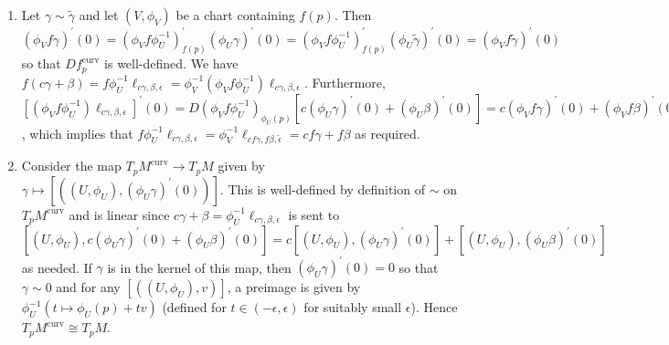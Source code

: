 \documentclass[11pt,leqno]{article}
\theoremstyle{plain}
\theoremstyle{definition}
\numberwithin{equation}{section}
\numberwithin{lem}{section}
\begin{document}
\begin{enumerate}
\begin{enumerate}
      The scalar multiplication on $T_pM^{\mathrm{curv}}$ is given by $c\gamma = \gamma(c(\cdot))\colon (-\epsilon/\abs{c},\epsilon/\abs{c})\to M$. This operation is well-defined since if $\gamma\sim\tilde \gamma$, then $(\phi_Uc\gamma)^\prime(0) = c(\phi_U\gamma)^\prime(0) = c(\phi_U\tilde\gamma)^\prime(0) = (\phi_Uc\tilde\gamma)^\prime(0)$ as needed. Observe that $(a+b)\gamma = a\gamma + b\gamma$ since $\ell_{a\gamma,b\gamma,\epsilon}^\prime = (a+b)(\phi_U\gamma)^\prime(0)$. It follows from the definition that the scalar multiplication satisfies the remaining unital and associative properties required to make $T_pM^{\mathrm{curv}}$ a vector space.
      \item Let $\gamma\sim\tilde\gamma$ and let $(V,\phi_V)$ be a chart containing $f(p)$. Then $(\phi_Vf\gamma)^\prime(0) = (\phi_Vf\phi_U^{-1})^\prime_{f(p)}(\phi_U\gamma)^\prime(0) = (\phi_Vf\phi_U^{-1})^\prime_{f(p)}(\phi_U\tilde\gamma)^\prime(0) = (\phi_Vf\tilde\gamma)^\prime(0)$ so that $Df_p^{\mathrm{curv}}$ is well-defined. We have $f(c\gamma + \beta) = f\phi_U^{-1}\ell_{c\gamma,\beta,\epsilon} = \phi_V^{-1}(\phi_Vf\phi_U^{-1})\ell_{c\gamma,\beta,\epsilon}$. Furthermore, $[(\phi_Vf\phi_U^{-1})\ell_{c\gamma,\beta,\epsilon}]^\prime(0) = D(\phi_Vf\phi_U^{-1})_{\phi_U(p)}[c(\phi_U\gamma)^\prime(0) + (\phi_U\beta)^\prime(0)] = c(\phi_Vf\gamma)^\prime(0) + (\phi_Vf\beta)^\prime(0) = (\phi_Vcf\gamma)^\prime(0) + (\phi_Vf\beta)^\prime(0)$, which implies that $f\phi_U^{-1}\ell_{c\gamma,\beta,\epsilon} = \phi_V^{-1}\ell_{cf\gamma,f\beta,\tilde\epsilon} = cf\gamma + f\beta$ as required.
      \item Consider the map $T_pM^{\mathrm{curv}}\to T_pM$ given by $\gamma\mapsto [((U,\phi_U),(\phi_U\gamma)^\prime(0))]$. This is well-defined by definition of $\sim$ on $T_pM^{\mathrm{curv}}$ and is linear since $c\gamma + \beta = \phi_U^{-1}\ell_{c\gamma,\beta,\epsilon}$ is sent to $[(U,\phi_U),c(\phi_U\gamma)^\prime(0) + (\phi_U\beta)^\prime(0)] = c[(U,\phi_U),(\phi_U\gamma)^\prime(0) ] + [(U,\phi_U),(\phi_U\beta)^\prime(0)]$ as needed. If $\gamma$ is in the kernel of this map, then $(\phi_U\gamma)^\prime(0) = 0$ so that $\gamma\sim 0$ and for any $[((U,\phi_U),v)]$, a preimage is given by $\phi_U^{-1}(t\mapsto \phi_U(p) + tv)$ (defined for $t\in (-\epsilon,\epsilon)$ for suitably small $\epsilon$). Hence $T_pM^{\mathrm{curv}}\cong T_pM$.
      

\end{enumerate}
\end{enumerate}
\end{document}
